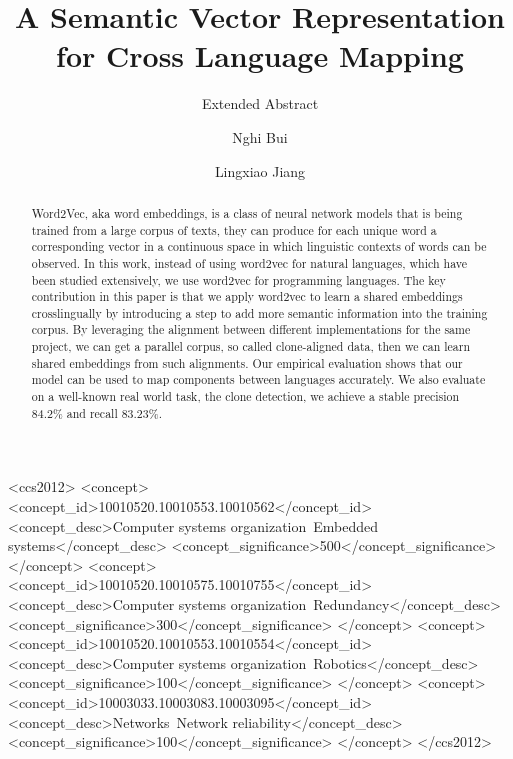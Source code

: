 \documentclass[sigconf]{acmart}
\begin{document}
\title{A Semantic Vector Representation for Cross Language Mapping}
\subtitle{Extended Abstract}


\author{Nghi Bui}


\author{Lingxiao Jiang}


\renewcommand{\shortauthors}{B. Trovato et al.}


\begin{abstract}
Word2Vec, aka word embeddings, is a class of neural network models that is being trained from a large corpus of texts, they can produce for each unique word a corresponding vector in a continuous space in which linguistic contexts of words can be observed. In this work, instead of using word2vec for natural languages, which have been studied extensively, we use word2vec for programming languages. The key contribution in this paper is that we apply word2vec to learn a shared embeddings crosslingually by introducing a step to add more semantic information into the training corpus. By leveraging the alignment between different implementations for the same project, we can get a parallel corpus, so called clone-aligned data, then we can learn shared embeddings from such alignments. Our empirical evaluation shows that our model can be used to map components between languages accurately. We also evaluate on a well-known real world task, the clone detection, we achieve a stable precision 84.2\% and recall 83.23\%.
\end{abstract}

%
%
\begin{CCSXML}
<ccs2012>
 <concept>
  <concept_id>10010520.10010553.10010562</concept_id>
  <concept_desc>Computer systems organization~Embedded systems</concept_desc>
  <concept_significance>500</concept_significance>
 </concept>
 <concept>
  <concept_id>10010520.10010575.10010755</concept_id>
  <concept_desc>Computer systems organization~Redundancy</concept_desc>
  <concept_significance>300</concept_significance>
 </concept>
 <concept>
  <concept_id>10010520.10010553.10010554</concept_id>
  <concept_desc>Computer systems organization~Robotics</concept_desc>
  <concept_significance>100</concept_significance>
 </concept>
 <concept>
  <concept_id>10003033.10003083.10003095</concept_id>
  <concept_desc>Networks~Network reliability</concept_desc>
  <concept_significance>100</concept_significance>
 </concept>
</ccs2012>  
\end{CCSXML}
\end{document}
